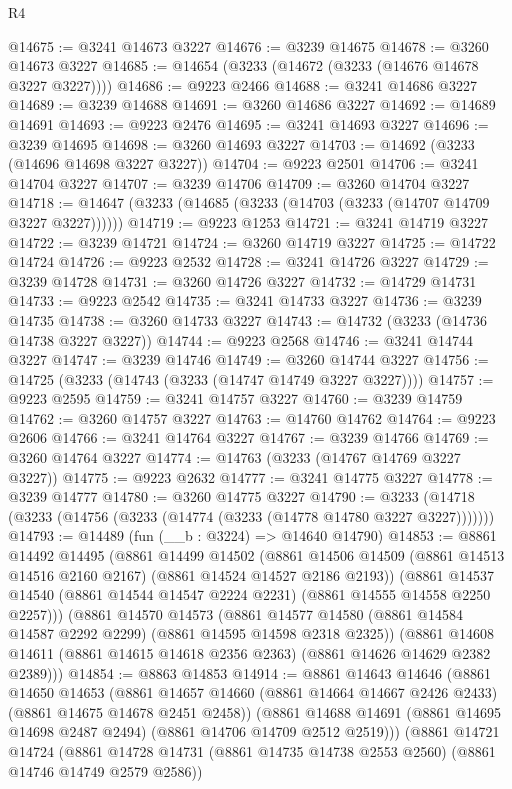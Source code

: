 \begin{lexlean}{R4}
\begin{coremodule}
@14675 := @3241 @14673 @3227
@14676 := @3239 @14675
@14678 := @3260 @14673 @3227
@14685 := @14654 (@3233 (@14672 (@3233 (@14676 @14678 @3227 @3227))))
@14686 := @9223 @2466
@14688 := @3241 @14686 @3227
@14689 := @3239 @14688
@14691 := @3260 @14686 @3227
@14692 := @14689 @14691
@14693 := @9223 @2476
@14695 := @3241 @14693 @3227
@14696 := @3239 @14695
@14698 := @3260 @14693 @3227
@14703 := @14692 (@3233 (@14696 @14698 @3227 @3227))
@14704 := @9223 @2501
@14706 := @3241 @14704 @3227
@14707 := @3239 @14706
@14709 := @3260 @14704 @3227
@14718 := @14647 (@3233 (@14685 (@3233 (@14703 (@3233 (@14707 @14709 @3227 @3227))))))
@14719 := @9223 @1253
@14721 := @3241 @14719 @3227
@14722 := @3239 @14721
@14724 := @3260 @14719 @3227
@14725 := @14722 @14724
@14726 := @9223 @2532
@14728 := @3241 @14726 @3227
@14729 := @3239 @14728
@14731 := @3260 @14726 @3227
@14732 := @14729 @14731
@14733 := @9223 @2542
@14735 := @3241 @14733 @3227
@14736 := @3239 @14735
@14738 := @3260 @14733 @3227
@14743 := @14732 (@3233 (@14736 @14738 @3227 @3227))
@14744 := @9223 @2568
@14746 := @3241 @14744 @3227
@14747 := @3239 @14746
@14749 := @3260 @14744 @3227
@14756 := @14725 (@3233 (@14743 (@3233 (@14747 @14749 @3227 @3227))))
@14757 := @9223 @2595
@14759 := @3241 @14757 @3227
@14760 := @3239 @14759
@14762 := @3260 @14757 @3227
@14763 := @14760 @14762
@14764 := @9223 @2606
@14766 := @3241 @14764 @3227
@14767 := @3239 @14766
@14769 := @3260 @14764 @3227
@14774 := @14763 (@3233 (@14767 @14769 @3227 @3227))
@14775 := @9223 @2632
@14777 := @3241 @14775 @3227
@14778 := @3239 @14777
@14780 := @3260 @14775 @3227
@14790 := @3233 (@14718 (@3233 (@14756 (@3233 (@14774 (@3233 (@14778 @14780 @3227 @3227)))))))
@14793 := @14489 (fun (__b : @3224) => @14640 @14790)
@14853 := @8861
    @14492
    @14495
    (@8861
      @14499
      @14502
      (@8861 @14506 @14509 (@8861 @14513 @14516 @2160 @2167) (@8861 @14524 @14527 @2186 @2193))
      (@8861 @14537 @14540 (@8861 @14544 @14547 @2224 @2231) (@8861 @14555 @14558 @2250 @2257)))
    (@8861
      @14570
      @14573
      (@8861 @14577 @14580 (@8861 @14584 @14587 @2292 @2299) (@8861 @14595 @14598 @2318 @2325))
      (@8861 @14608 @14611 (@8861 @14615 @14618 @2356 @2363) (@8861 @14626 @14629 @2382 @2389)))
@14854 := @8863 @14853
@14914 := @8861
    @14643
    @14646
    (@8861
      @14650
      @14653
      (@8861 @14657 @14660 (@8861 @14664 @14667 @2426 @2433) (@8861 @14675 @14678 @2451 @2458))
      (@8861 @14688 @14691 (@8861 @14695 @14698 @2487 @2494) (@8861 @14706 @14709 @2512 @2519)))
    (@8861
      @14721
      @14724
      (@8861 @14728 @14731 (@8861 @14735 @14738 @2553 @2560) (@8861 @14746 @14749 @2579 @2586))

\end{coremodule}
\end{lexlean}
